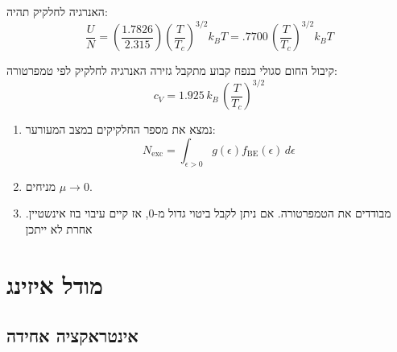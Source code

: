 \documentclass{tstextbook}
\begin{document}
\begin{corollary}
האנרגיה לחלקיק תהיה:
$${\frac{U}{N}}=\left({\frac{1.7826}{2.315}}\right)\left({\frac{T}{T_c}}\right)^{3/2}k_{B}T=.7700\,\left({\frac{T}{T_c}}\right)^{3/2}k_{B}T$$

\end{corollary}
\begin{corollary}
קיבול החום סגולי בנפח קבוע מתקבל גזירה האנרגיה לחלקיק לפי טמפרטורה:
$$c_{V}=1.925\,k_{B}\,\left(\frac{T}{T_c}\right)^{3/2}$$

\end{corollary}
\begin{proposition}
  \begin{enumerate}
    \item נמצא את מספר החלקיקים במצב המעורער: 
$$N_{\mathrm{exc}}=\int_{\epsilon>0}g(\epsilon)f_{\mathrm{BE}}(\epsilon)\,d\epsilon$$


    \item מניחים \(\mu\to 0\).  


    \item מבודדים את הטמפרטורה. אם ניתן לקבל ביטוי גדול מ-0, אז קיים עיבוי בוז אינשטיין. אחרת לא ייתכן 


  \end{enumerate}
\end{proposition}
\begin{example}
\end{example}
\section{מודל איזינג}

\subsection{אינטראקציה אחידה}
\end{document}
